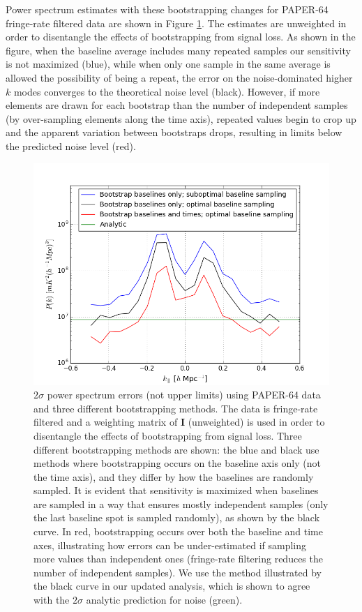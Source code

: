\documentclass[preprint2,numberedappendix,tighten]{aastex6}  %
\begin{document}
Power spectrum estimates with these bootstrapping changes for PAPER-64 fringe-rate filtered data are shown in Figure 
\ref{fig:data_errors}. The estimates are unweighted in order to disentangle the effects of bootstrapping from signal loss. As 
shown in the figure, when the baseline average includes many repeated samples our sensitivity is not maximized (blue), while when 
only one sample in the same average is allowed the possibility of being a repeat, the error on the noise-dominated higher $k$ 
modes converges to the theoretical noise level (black).  However, if more elements are drawn for each bootstrap than the number of 
independent samples (by over-sampling elements along the time axis), repeated values begin to crop up and the apparent 
variation between bootstraps drops, resulting in limits below the predicted noise level (red).

\begin{figure}
	\centering
	\includegraphics[trim={0.3cm 0cm 0.3cm 0.3cm},width=\columnwidth]{plots/data_errors.png}
	\caption{$2\sigma$ power spectrum errors (not upper limits) using PAPER-64 data and three different bootstrapping 
methods. The data is fringe-rate filtered and a weighting matrix of $\textbf{I}$ (unweighted) is used in order to disentangle the 
effects of bootstrapping from signal loss. Three different bootstrapping methods are shown: the blue and black use methods 
where bootstrapping occurs on the baseline axis only (not the time axis), and they differ by how the baselines are randomly 
sampled. It is evident that sensitivity is maximized when baselines are sampled in a way that ensures mostly independent 
samples (only the last baseline spot is sampled randomly), as shown by the black curve. In red, bootstrapping occurs over both 
the baseline and time axes, illustrating how errors can be under-estimated if sampling more values than independent ones 
(fringe-rate filtering reduces the number of independent samples). We use the method illustrated by the black curve in our 
updated analysis, which is shown to agree with the $2\sigma$ analytic prediction for noise (green).}
	\label{fig:data_errors}
\end{figure}
\end{document}

